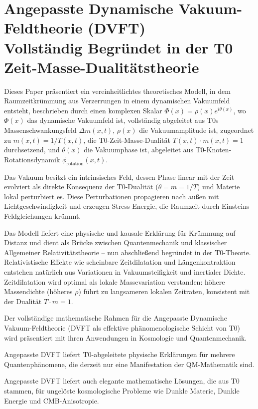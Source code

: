 \chapter{Angepasste Dynamische Vakuum-Feldtheorie (DVFT)\\ 
	Vollständig Begründet in der T0 Zeit-Masse-Dualitätstheorie}

	\begin{t0box}[Zusammenfassung]
		Dieses Paper präsentiert ein vereinheitlichtes theoretisches Modell, in dem Raumzeitkrümmung aus Verzerrungen in einem dynamischen Vakuumfeld entsteht, beschrieben durch einen komplexen Skalar $\Phi(x)=\rho(x)e^{i\theta(x)}$, wo $\Phi(x)$ das dynamische Vakuumfeld ist, vollständig abgeleitet aus T0s Massenschwankungsfeld $\Delta m(x,t)$, $\rho(x)$ die Vakuumamplitude ist, zugeordnet zu $m(x,t) = 1/T(x,t)$, die T0-Zeit-Masse-Dualität $T(x,t) \cdot m(x,t) = 1$ durchsetzend, und $\theta(x)$ die Vakuumphase ist, abgeleitet aus T0-Knoten-Rotationsdynamik $\phi_{\text{rotation}}(x,t)$.
		
		Das Vakuum besitzt ein intrinsisches Feld, dessen Phase linear mit der Zeit evolviert als direkte Konsequenz der T0-Dualität ($\dot{\theta} = m = 1/T$) und Materie lokal perturbiert es. Diese Perturbationen propagieren nach außen mit Lichtgeschwindigkeit und erzeugen Stress-Energie, die Raumzeit durch Einsteins Feldgleichungen krümmt.
		
		Das Modell liefert eine physische und kausale Erklärung für Krümmung auf Distanz und dient als Brücke zwischen Quantenmechanik und klassischer Allgemeiner Relativitätstheorie – nun abschließend begründet in der T0-Theorie. Relativistische Effekte wie scheinbare Zeitdilatation und Längenkontraktion entstehen natürlich aus Variationen in Vakuumsteifigkeit und inertialer Dichte. Zeitdilatation wird optimal als lokale Massevariation verstanden: höhere Massendichte (höheres $\rho$) führt zu langsameren lokalen Zeitraten, konsistent mit der Dualität $T \cdot m = 1$.
		
		Der vollständige mathematische Rahmen für die Angepasste Dynamische Vakuum-Feldtheorie (DVFT als effektive phänomenologische Schicht von T0) wird präsentiert mit ihren Anwendungen in Kosmologie und Quantenmechanik.
		
		Angepasste DVFT liefert T0-abgeleitete physische Erklärungen für mehrere Quantenphänomene, die derzeit nur eine Manifestation der QM-Mathematik sind.
		
		Angepasste DVFT liefert auch elegante mathematische Lösungen, die aus T0 stammen, für ungelöste kosmologische Probleme wie Dunkle Materie, Dunkle Energie und CMB-Anisotropie.
	\end{t0box}
	
